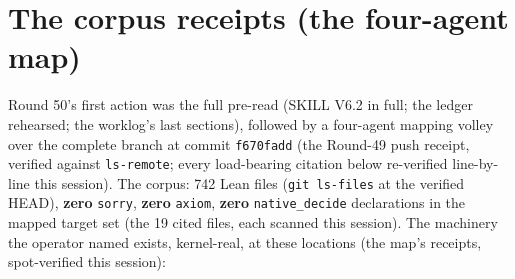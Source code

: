 \documentclass[11pt]{article}
\begin{document}
\section{The corpus receipts (the four-agent map)}

Round 50's first action was the full pre-read (SKILL V6.2 in full; the ledger rehearsed; the worklog's last sections), followed by a four-agent mapping volley over the complete branch at commit \texttt{f670fadd} (the Round-49 push receipt, verified against \texttt{ls-remote}; every load-bearing citation below re-verified line-by-line this session). The corpus: 742 Lean files (\texttt{git ls-files} at the verified HEAD), \textbf{zero} \texttt{sorry}, \textbf{zero} \texttt{axiom}, \textbf{zero} \texttt{native\_decide} declarations in the mapped target set (the 19 cited files, each scanned this session). The machinery the operator named exists, kernel-real, at these locations (the map's receipts, spot-verified this session):
\end{document}

